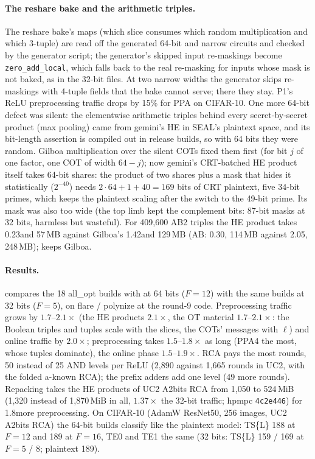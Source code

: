 \paragraph{The reshare bake and the arithmetic triples.} The reshare bake's maps (which slice consumes which random
multiplication and which 3-tuple) are read off the generated 64-bit and narrow circuits and checked by the generator
script; the generator's skipped input re-maskings become \texttt{zero\_add\_local}, which falls back to the real
re-masking for inputs whose mask is not baked, as in the 32-bit files. At two narrow widths the generator skips
re-maskings with 4-tuple fields that the bake cannot serve; there they stay. P1's ReLU preprocessing traffic drops by
15\% for PPA on CIFAR-10. One more 64-bit defect was silent: the elementwise arithmetic triples behind every
secret-by-secret product (max pooling) came from gemini's HE in SEAL's plaintext space, and its bit-length assertion
is compiled out in release builds, so with 64 bits they were random. Gilboa multiplication over the silent COTs fixed
them first (for bit $j$ of one factor, one COT of width $64 - j$); now gemini's CRT-batched HE product itself takes 64-bit
shares: the product of two shares plus a mask that hides it statistically ($2^{-40}$) needs $2 \cdot 64 + 1 + 40 = 169$
bits of CRT plaintext, five 34-bit primes, which keeps the plaintext scaling after the switch to the 49-bit prime. Its mask
was also too wide (the top limb kept the complement bits: 87-bit masks at 32 bits, harmless but wasteful). For 409{,}600
AB2 triples the HE product takes 0.23\s and 57\,MB against Gilboa's 1.42\s and 129\,MB (AB: 0.30\s, 114\,MB against
2.05\s, 248\,MB);  keeps Gilboa.

\paragraph{Results.}  compares the 18 all\_opt builds with  at 64 bits ($F = 12$) with
the same builds at 32 bits ($F = 5$), on flare / polynize at the round-9 code. Preprocessing traffic grows by
$1.7$--$2.1\times$ (the HE products $2.1\times$, the OT material $1.7$--$2.1\times$: the Boolean triples and tuples scale
with the slices, the COTs' messages with $\ell$) and online traffic by $2.0\times$; preprocessing takes $1.5$--$1.8\times$ as
long (PPA4 the most, whose tuples dominate), the online phase $1.5$--$1.9\times$. RCA pays the most rounds, 50 instead of 25
AND levels per ReLU (2{,}890 against 1{,}665 rounds in UC2, with the folded a-known RCA); the prefix adders add one level
(49 more rounds). Repacking takes
the HE products of UC2 A2bits RCA from 1{,}050 to 524\,MiB (1{,}320 instead of 1{,}870\,MiB in all, $1.37\times$ the 32-bit
traffic; hpmpc \texttt{4c2e446}) for 1.8\s more preprocessing. On CIFAR-10 (AdamW ResNet50, 256 images, UC2 A2bits RCA) the 64-bit builds classify
like the plaintext model: TS\{L\} 188 at $F = 12$ and 189 at $F = 16$, TE0 and TE1 the same (32 bits: TS\{L\} 159 / 169 at
$F = 5$ / 8; plaintext 189).

